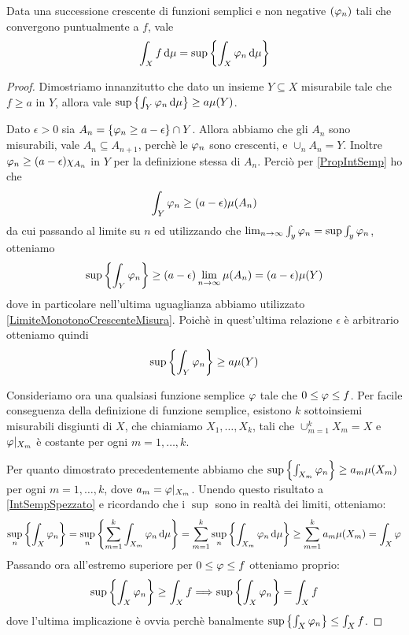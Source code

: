 \begin{proposition}
	Data una successione crescente di funzioni semplici e non negative $(\varphi_n)$ tali che convergono puntualmente a $f$, vale 
	\begin{equation*}
		\int_X f\,\mathrm d\mu=\sup\left\{\int_X\varphi_n\,\mathrm d\mu\right\}
	\end{equation*}
\end{proposition}
\begin{proof}
	Dimostriamo innanzitutto che dato un insieme $Y\subseteq X$ misurabile tale che $f\ge a$ in $Y$, allora vale $\sup\left\{\int_Y\varphi_n\,\mathrm d\mu\right\}\ge a\mu(Y)$.
	
	Dato $\epsilon>0$ sia $A_n=\{\varphi_n\ge a-\epsilon\}\cap Y$. Allora abbiamo che gli $A_n$ sono misurabili, vale $A_n\subseteq A_{n+1}$, perchè le $\varphi_n$ sono crescenti, e $\cup_nA_n=Y$. Inoltre $\varphi_n\ge (a-\epsilon)\chi_{A_n}$ in $Y$ per la definizione stessa di $A_n$. Perciò per \cref{PropIntSemp} ho che
	\begin{equation*}
		\int_Y\varphi_n\ge(a-\epsilon)\mu(A_n)
	\end{equation*}
	da cui passando al limite su $n$ ed utilizzando che $\lim_{n\to\infty}\int_y\varphi_n=\sup\int_y\varphi_n$, otteniamo
	\begin{equation*}
		\sup\left\{\int_Y\varphi_n\right\}\ge(a-\epsilon)\lim_{n\to\infty}\mu(A_n)=(a-\epsilon)\mu(Y)
	\end{equation*}
	dove in particolare nell'ultima uguaglianza abbiamo utilizzato \cref{LimiteMonotonoCrescenteMisura}. Poichè in quest'ultima relazione $\epsilon$ è arbitrario otteniamo quindi
	\begin{equation*}
		\sup\left\{\int_Y\varphi_n\right\}\ge a\mu(Y)
	\end{equation*}

	Consideriamo ora una qualsiasi funzione semplice $\varphi$ tale che $0\le \varphi\le f$. Per facile conseguenza della definizione di funzione semplice, esistono $k$ sottoinsiemi misurabili disgiunti di $X$, che chiamiamo $X_1,\dots,X_k$, tali che $\cup_{m=1}^kX_m=X$ e $\varphi|_{X_m}$ è costante per ogni $m=1,\dots,k$.
	
	Per quanto dimostrato precedentemente abbiamo che $\sup\left\{\int_{X_m}\varphi_n\right\}\ge a_m\mu(X_m)$ per ogni $m=1,\dots,k$, dove $a_m=\varphi|_{X_m}$. Unendo questo risultato a \cref{IntSempSpezzato} e ricordando che i $\sup$ sono in realtà dei limiti, otteniamo:
	\begin{equation*}
		\sup_n\left\{\int_X\varphi_n\right\}=\sup_n\left\{\sum_{m=1}^k \int_{X_m}\varphi_n\,\mathrm d \mu\right\}=\sum_{m=1}^k\sup_n\left\{ \int_{X_m}\varphi_n\,\mathrm d \mu\right\}\ge \sum_{m=1}^ka_m\mu(X_m)=\int_X\varphi
	\end{equation*}
	Passando ora all'estremo superiore per $0\le \varphi \le f$ otteniamo proprio:
	\begin{equation*}
		\sup\left\{\int_X\varphi_n\right\}\ge \int_X f \Longrightarrow \sup\left\{\int_X\varphi_n\right\}= \int_X f
	\end{equation*}
	dove l'ultima implicazione è ovvia perchè banalmente $\sup\left\{\int_X\varphi_n\right\}\le \int_X f$.



\end{proof}






